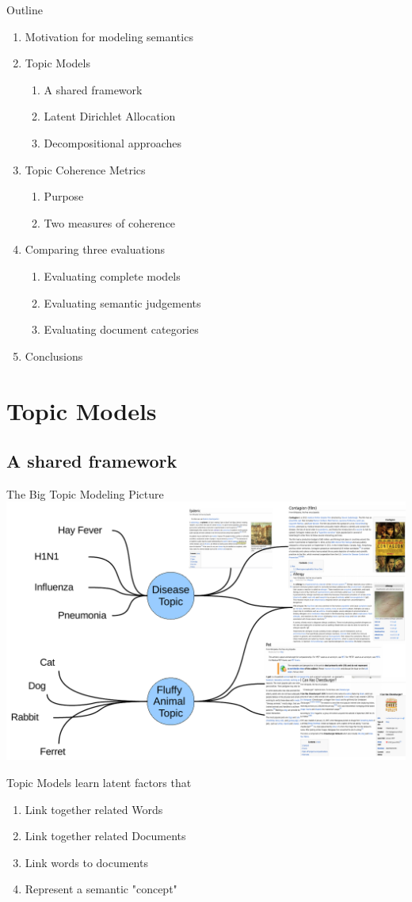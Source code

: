 \documentclass[compress]{beamer}
\begin{document}
\begin{frame}{Outline}
\begin{enumerate}
\item Motivation for modeling semantics
\item Topic Models
    \begin{enumerate}
    \item A shared framework
    \item Latent Dirichlet Allocation
    \item Decompositional approaches
    \end{enumerate}
\item Topic Coherence Metrics
    \begin{enumerate}
    \item Purpose
    \item Two measures of coherence
    \end{enumerate}
\item Comparing three evaluations
   \begin{enumerate}
   \item Evaluating complete models
   \item Evaluating semantic judgements
   \item Evaluating document categories
   \end{enumerate}
\item Conclusions
\end{enumerate}
\end{frame}

\section{Topic Models}

\subsection{A shared framework}

\begin{frame}{The Big Topic Modeling Picture}
\center
\includegraphics[width=.80\textwidth,height=.40\textwidth]{figures/topic-connection.pdf}

Topic Models learn latent factors that
\begin{enumerate}
\item Link together related Words
\item Link together related Documents
\item Link words to documents
\item Represent a semantic "concept"
\end{enumerate}
\end{frame}
\end{document}
